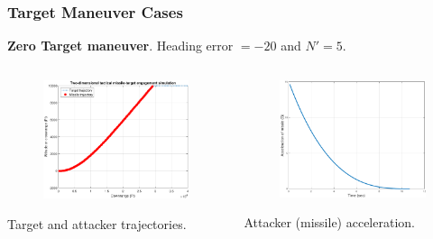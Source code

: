 \documentclass{beamer}
\begin{document}
\begin{frame}
\frametitle{Target Maneuver Cases}

\textbf{Zero Target maneuver}. Heading error $=-20$ and $N'= 5$.
\begin{columns}[c]
	\begin{column}{.45\linewidth}
		\begin{figure}[H]
			\centering
			\includegraphics[scale = 0.225]{fig/trajectoryXNT0HE20N5.pdf}
			\label{trajectory20N5}
		\end{figure}
		Target and attacker trajectories.
	\end{column}
	\begin{column}{.45\linewidth}
		\begin{figure}[H]
			\centering
			\includegraphics[scale = 0.225]{fig/MissileAccelerationXNT0HE20N5.pdf}
			\label{missile acceleration20N5}
		\end{figure}
		Attacker (missile) acceleration.
	\end{column}
\end{columns}
\end{frame}
\end{document}
